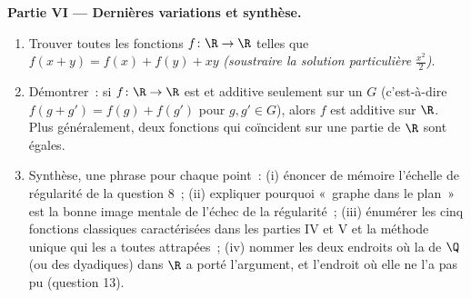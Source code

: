 \begin{problem}[{Devoir maison --- $f(x + y) = f(x) + f(y)$~:
la régularité force la linéarité, et le portrait des monstres}]
\medskip
\noindent\textbf{Partie VI --- Dernières variations et synthèse.}
\begin{enumerate}[resume]
  \item Trouver toutes les fonctions  $f \colon \R \to \R$
        telles que $f(x + y) = f(x) + f(y) + xy$ \emph{(soustraire
        la solution particulière $\frac{x^2}{2}$)}.
  \item Démontrer~: si $f \colon \R \to \R$ est  et
        additive seulement sur un \emph{ } $G$
        (c'est-à-dire $f(g + g') = f(g) + f(g')$ pour $g, g' \in
        G$), alors $f$ est additive sur $\R$. Plus généralement,
        deux fonctions  qui coïncident sur une partie
         de $\R$ sont égales.
  \item Synthèse, une phrase pour chaque point~: (i) énoncer de
        mémoire l'échelle de régularité de la question 8~; (ii)
        expliquer pourquoi «~graphe  dans le plan~» est la
        bonne image mentale de l'échec de la régularité~; (iii)
        énumérer les cinq fonctions classiques caractérisées dans
        les parties IV et V et la méthode unique qui les a toutes
        attrapées~; (iv) nommer les deux endroits où la  de
        $\Q$ (ou des dyadiques) dans $\R$ a porté l'argument, et
        l'endroit où elle ne l'a pas pu (question 13).
\end{enumerate}
\end{problem}
